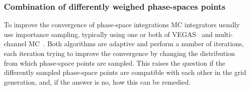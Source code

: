 \subsubsection{Combination of differently weighed phase-spaces points}

To improve the convergence of phase-space integrations MC integrators usually use importance sampling, typically using one or both of VEGAS~\cite{} and multi-channel MC~\cite{}.
Both algorithms are adaptive and perform a number of iterations, each iteration trying to improve the convergence by changing the distribution from which phase-space points are sampled.
This raises the question if the differently sampled phase-space points are compatible with each other in the grid generation, and, if the answer is no, how this can be remedied.
